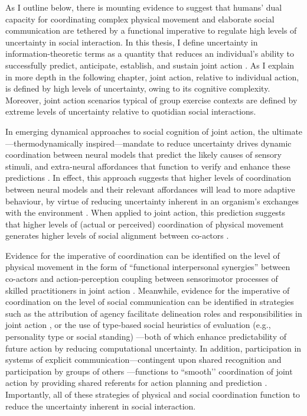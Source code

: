 \begin{CJK}{UTF8}{gbsn}
As I outline below, there is mounting evidence to suggest that humans' dual capacity for coordinating complex physical movement and elaborate social communication are tethered by a functional imperative to regulate high levels of uncertainty in social interaction.  In this thesis, I define uncertainty in information-theoretic terms as a quantity that reduces an individual's ability to successfully predict, anticipate, establish, and sustain joint action \citep{Shannon1963}.  As I explain in more depth in the following chapter, joint action, relative to individual action, is defined by high levels of uncertainty, owing to its cognitive complexity.  Moreover, joint action scenarios typical of group exercise contexts are defined by extreme levels of uncertainty relative to quotidian social interactions.

In emerging dynamical approaches to social cognition of joint action, the ultimate---thermodynamically inspired---mandate to reduce uncertainty drives dynamic coordination between neural models that predict the likely causes of sensory stimuli,  and extra-neural affordances that function to verify and enhance these predictions \citep{Friston2015,Ramstead2016}.  In effect, this approach suggests that higher levels of coordination between neural models and their relevant affordances will lead to more adaptive behaviour, by virtue of reducing uncertainty inherent in an organism's exchanges with the environment \citep{Firston2010,Ramstead2017}.  When applied to joint action, this prediction suggests that higher levels of (actual or perceived) coordination of physical movement generates higher levels of social alignment between co-actors \citep[]{Semin2008,Wheatley2012}.

Evidence for the imperative of coordination can be identified on the level of physical movement in the form of ``functional interpersonal synergies'' \citep{Riley2011} between co-actors and action-perception coupling between sensorimotor processes of skilled practitioners in joint action \citep{Novembre2014}.  Meanwhile, evidence for the imperative of coordination on the level of social communication can be identified in strategies such as the attribution of agency facilitate delineation roles and responsibilities in joint action \citep{Wolpert2003,Sato2008,VanderWel2012VanderWel2012}, or the use of type-based social heuristics of evaluation (e.g., personality type or social standing) \citep{Moutoussis2014}---both of which enhance predictability of future action by reducing computational uncertainty.
In addition, participation in systems of explicit communication---contingent upon shared recognition and participation by groups of others \citep{Ramstead2016}---functions to ``smooth’’ coordination of joint action by providing shared referents for action planning and prediction \citep{Vesper2017}.
Importantly, all of these strategies of physical and social coordination function to reduce the uncertainty inherent in social interaction.


\end{CJK}
